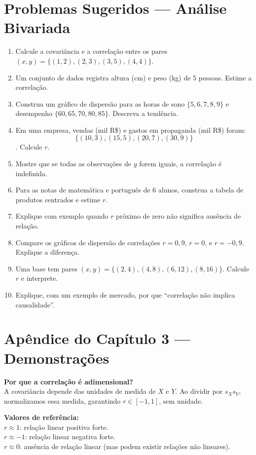 \section*{Problemas Sugeridos — Análise Bivariada}

\begin{enumerate}[leftmargin=*]
  \item Calcule a covariância e a correlação entre os pares $(x,y)=\{(1,2),(2,3),(3,5),(4,4)\}$.  
  \item Um conjunto de dados registra altura (cm) e peso (kg) de 5 pessoas. Estime a correlação.  
  \item Construa um gráfico de dispersão para as horas de sono $\{5,6,7,8,9\}$ e desempenho $\{60,65,70,80,85\}$. Descreva a tendência.  
  \item Em uma empresa, vendas (mil R\$) e gastos em propaganda (mil R\$) foram:
  $$\{(10,3),(15,5),(20,7),(30,9)\}$$. Calcule $r$.  
  \item Mostre que se todas as observações de $y$ forem iguais, a correlação é indefinida.  
  \item Para as notas de matemática e português de 6 alunos, construa a tabela de produtos centrados e estime $r$.  
  \item Explique com exemplo quando $r$ próximo de zero não significa ausência de relação.  
  \item Compare os gráficos de dispersão de correlações $r=0,9$, $r=0$, e $r=-0,9$. Explique a diferença.  
  \item Uma base tem pares $(x,y)=\{(2,4),(4,8),(6,12),(8,16)\}$. Calcule $r$ e interprete.  
  \item Explique, com um exemplo de mercado, por que “correlação não implica causalidade”.
\end{enumerate}

\section*{Apêndice do Capítulo 3 — Demonstrações}

\begin{ProofBox}
\textbf{Por que a correlação é adimensional?}\\[4pt]
A covariância depende das unidades de medida de $X$ e $Y$.  
Ao dividir por $s_X s_Y$, normalizamos essa medida, garantindo $r \in [-1,1]$, sem unidade.  

\textbf{Valores de referência:}\\
$r \approx 1$: relação linear positiva forte.\\
$r \approx -1$: relação linear negativa forte.\\
$r \approx 0$: ausência de relação linear (mas podem existir relações não lineares).
\end{ProofBox}

